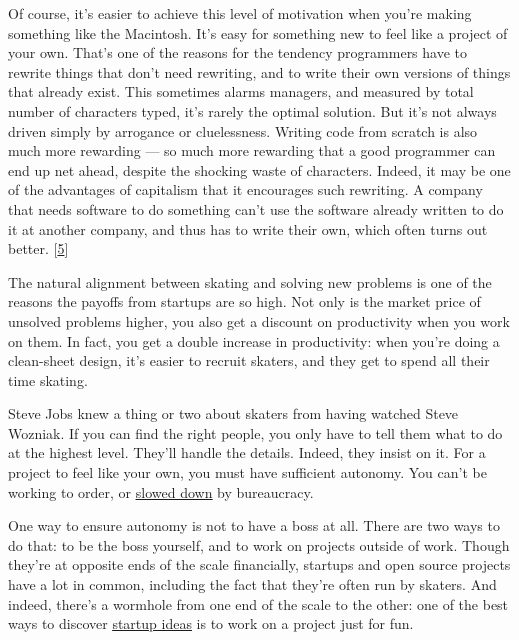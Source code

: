 Of course, it's easier to achieve this level
                  of motivation when you're making something like the Macintosh.
                  It's easy for something new to feel like a project of your
                  own. That's one of the reasons for the tendency programmers
                  have to rewrite things that don't need rewriting, and to write
                  their own versions of things that already exist. This
                  sometimes alarms managers, and measured by total number of
                  characters typed, it's rarely the optimal solution. But it's
                  not always driven simply by arrogance or cluelessness. Writing
                  code from scratch is also much more rewarding --- so much
                  more rewarding that a good programmer can end up net ahead,
                  despite the shocking waste of characters. Indeed, it may be
                  one of the advantages of capitalism that it encourages such
                  rewriting. A company that needs software to do something can't
                  use the software already written to do it at another company,
                  and thus has to write their own, which often turns out better.
                  [\href{\#f5n}{5}]

The natural alignment between skating and solving
                  new problems is one of the reasons the payoffs from startups
                  are so high. Not only is the market price of unsolved problems
                  higher, you also get a discount on productivity when you work
                  on them. In fact, you get a double increase in productivity:
                  when you're doing a clean-sheet design, it's easier to recruit
                  skaters, and they get to spend all their time skating.

Steve
                  Jobs knew a thing or two about skaters from having watched
                  Steve Wozniak. If you can find the right people, you only have
                  to tell them what to do at the highest level. They'll handle
                  the details. Indeed, they insist on it. For a project to feel
                  like your own, you must have sufficient autonomy. You can't be
                  working to order, or
                  \href{http://www.paulgraham.com/artistsship.html}{\underline{slowed down}} by
                  bureaucracy.

One way to ensure autonomy is not to
                  have a boss at all. There are two ways to do that: to be the
                  boss yourself, and to work on projects outside of work. Though
                  they're at opposite ends of the scale financially, startups
                  and open source projects have a lot in common, including the
                  fact that they're often run by skaters. And indeed, there's a
                  wormhole from one end of the scale to the other: one of the
                  best ways to discover
                  \href{http://www.paulgraham.com/startupideas.html}{\underline{startup ideas}} is to
                  work on a project just for fun.


